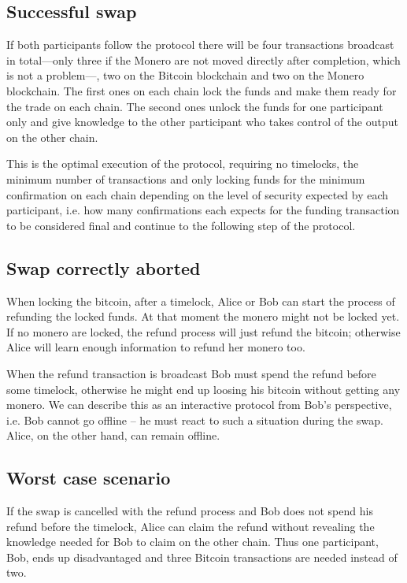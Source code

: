 \documentclass{llncs}
\begin{document}
\subsection{Successful swap}
If both participants follow the protocol there will be four transactions broadcast in total---only three if the Monero are not moved directly after completion, which is not a problem---, two on the Bitcoin blockchain and two on the Monero blockchain. The first ones on each chain lock the funds and make them ready for the trade on each chain. The second ones unlock the funds for one participant only and give knowledge to the other participant who takes control of the output on the other chain.

This is the optimal execution of the protocol, requiring no timelocks, the minimum number of transactions and only locking funds for the minimum confirmation on each chain depending on the level of security expected by each participant, i.e. how many confirmations each expects for the funding transaction to be considered final and continue to the following step of the protocol.

\subsection{Swap correctly aborted}
When locking the bitcoin, after a timelock, Alice or Bob can start the process of refunding the locked funds. At that moment the monero might not be locked yet. If no monero are locked, the refund process will just refund the bitcoin; otherwise Alice will learn enough information to refund her monero too.

When the refund transaction is broadcast Bob must spend the refund before some timelock, otherwise he might end up loosing his bitcoin without getting any monero.  We can describe this as an interactive protocol from Bob's perspective, i.e. Bob cannot go offline -- he must react to such a situation during the swap. Alice, on the other hand, can remain offline.

\subsection{Worst case scenario}
If the swap is cancelled with the refund process and Bob does not spend his refund before the timelock, Alice can claim the refund without revealing the knowledge needed for Bob to claim on the other chain. Thus one participant, Bob, ends up disadvantaged and three Bitcoin transactions are needed instead of two.
\end{document}
